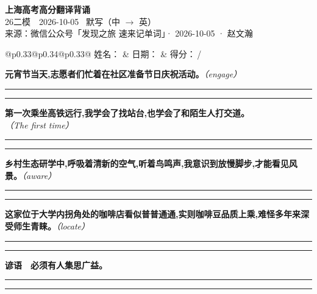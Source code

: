\documentclass[11pt,a4paper]{article}
\newcommand{\num}[1]{\makebox[1.9em][r]{#1.}\hspace{0.3em}}
\newcommand{\wline}{\noindent\rule{\linewidth}{0.4pt}}
\newcommand{\prompt}[1]{\emph{\textcolor{tipblue}{\small（#1）}}}
\begin{document}
\pagestyle{plain}
\begin{center}
{\LARGE\bfseries 上海高考高分翻译背诵 }\\[0.25em]
{\large 26二模　2026-10-05 \quad\ 默写（中 $\to$ 英）}\\[0.35em]
{\footnotesize 来源：微信公众号「发现之旅 速来记单词」· 2026-10-05 · 赵文瀚}
\end{center}

\vspace{0.4em}
\noindent\begin{tabular}{@{}p{0.33\textwidth}@{}p{0.34\textwidth}@{}p{0.33\textwidth}@{}}
姓名：\underline{\hspace{2.0cm}} & 日期：\underline{\hspace{2.0cm}} & 得分：\underline{\hspace{1.4cm}}\,/ \\
\end{tabular}

\vspace{0.5em}

\vspace{0.8em}
\num{1}\textbf{元宵节当天,志愿者们忙着在社区准备节日庆祝活动。}\prompt{engage}

\vspace{0.3em}

\wline\vspace{0.3em}
\wline

\num{2}\textbf{第一次乘坐高铁远行,我学会了找站台,也学会了和陌生人打交道。}\prompt{The first time}

\vspace{0.3em}

\wline\vspace{0.3em}
\wline

\num{3}\textbf{乡村生态研学中,呼吸着清新的空气,听着鸟鸣声,我意识到放慢脚步,才能看见风景。}\prompt{aware}

\vspace{0.3em}

\wline\vspace{0.3em}
\wline

\num{4}\textbf{这家位于大学内拐角处的咖啡店看似普普通通,实则咖啡豆品质上乘,难怪多年来深受师生青睐。}\prompt{locate}

\vspace{0.3em}

\wline\vspace{0.3em}
\wline

\vspace{0.4em}\noindent{\color{rulegray}\rule{\textwidth}{0.6pt}}\vspace{0.4em}

\num{5}\textbf{谚语　必须有人集思广益。}

\vspace{0.3em}

\wline\vspace{0.3em}
\wline
\end{document}
